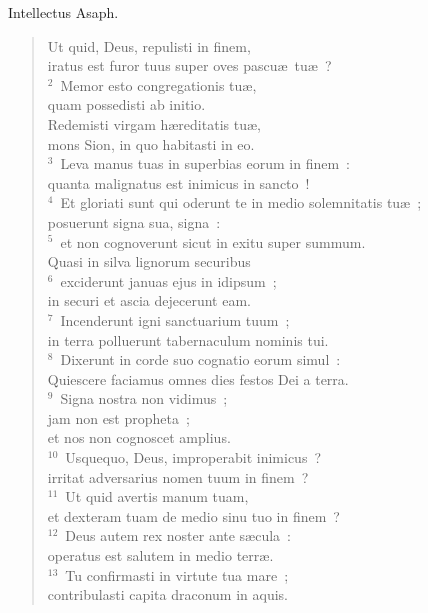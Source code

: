 \bchapter
\lettrine[lines=3,image=true,loversize=0.05,lraise=-0.03]{I}{}ntellectus Asaph. \begin{flushleft}\begin{verse}\vspace{6pt}Ut quid, Deus, repulisti in finem,\\ iratus est furor tuus super oves pascu\ae\ tu\ae~?\\
${}^{2}$~Memor esto congregationis tu\ae ,\\ quam possedisti ab initio.\\ Redemisti virgam h\ae reditatis tu\ae ,\\ mons Sion, in quo habitasti in eo.\\
${}^{3}$~Leva manus tuas in superbias eorum in finem~:\\ quanta malignatus est inimicus in sancto~!\\
${}^{4}$~Et gloriati sunt qui oderunt te in medio solemnitatis tu\ae~;\\ posuerunt signa sua, signa~:\\
${}^{5}$~et non cognoverunt sicut in exitu super summum.\\ Quasi in silva lignorum securibus\\
${}^{6}$~exciderunt januas ejus in idipsum~;\\ in securi et ascia dejecerunt eam.\\
${}^{7}$~Incenderunt igni sanctuarium tuum~;\\ in terra polluerunt tabernaculum nominis tui.\\
${}^{8}$~Dixerunt in corde suo cognatio eorum simul~:\\ Quiescere faciamus omnes dies festos Dei a terra.\\
${}^{9}$~Signa nostra non vidimus~;\\ jam non est propheta~;\\ et nos non cognoscet amplius.\\
${}^{10}$~Usquequo, Deus, improperabit inimicus~?\\ irritat adversarius nomen tuum in finem~?\\
${}^{11}$~Ut quid avertis manum tuam,\\ et dexteram tuam de medio sinu tuo in finem~?\\
${}^{12}$~Deus autem rex noster ante s\ae cula~:\\ operatus est salutem in medio terr\ae .\\
${}^{13}$~Tu confirmasti in virtute tua mare~;\\ contribulasti capita draconum in aquis.\\

\end{verse}
\end{flushleft}
